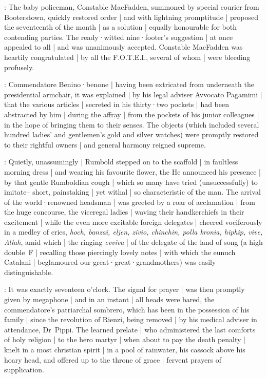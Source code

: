 :
The baby policeman,
Constable MacFadden,
summoned by special courier from Booterstown,
quickly restored order |
and with lightning promptitude |
proposed the seventeenth of the month
 |
as a solution |
equally honourable for both contending parties.
The ready·witted nine·footer's suggestion |
at once appealed to all |
and was unanimously accepted.
Constable MacFadden was heartily congratulated |
by all the F.O.T.E.I.,
several of whom |
were bleeding profusely.

:
Commendatore Benino·benone |
having been extricated from underneath the presidential armchair,
it was explained |
by his legal adviser Avvocato Pagamimi |
that the various articles |
secreted in his thirty·two pockets |
had been abstracted by him |
during the affray |
from the pockets of his junior colleagues |
in the hope of bringing them to their senses.
The objects
(which included several hundred ladies' and gentlemen's gold and silver watches)
were promptly restored to their rightful owners |
and general harmony reigned supreme.

:
Quietly, unassumingly |
Rumbold stepped on to the scaffold |
in faultless morning dress |
and wearing his favourite flower,
the 
He announced his presence |
by that gentle Rumboldian cough |
which so many have tried (unsuccessfully) to imitate--%
short,
painstaking |
yet withal |
so characteristic of the man.
The arrival of the world·renowned headsman |
was greeted by a roar of acclamation |
from the huge concourse,
the viceregal ladies |
waving their handkerchiefs in their excitement |
while the even more excitable foreign delegates |
cheered vociferously in a medley of cries,
\emph{hoch,
banzai,
eljen,
zivio,
chinchin,
polla kronia,
hiphip,
vive,
Allah},
amid which |
the ringing \emph{evviva} |
of the delegate of the land of song
(a high double~F |
recalling those piercingly lovely notes |
with which the eunuch Catalani |
beglamoured our great·great·grandmothers)
was easily distinguishable.

:
It was exactly seventeen o'clock.
The signal for prayer |
was then promptly given by megaphone |
and in an instant |
all heads were bared,
the commendatore's patriarchal sombrero,
which has been in the possession of his family |
since the revolution of Rienzi,
being removed |
by his medical adviser in attendance,
Dr~Pippi.
The learned prelate |
who administered the last comforts of holy religion |
to the hero martyr |
when about to pay the death penalty
 |
knelt in a most christian spirit |
in a pool of rainwater,
his cassock above his hoary head,
and offered up to the throne of grace |
fervent prayers of supplication.

